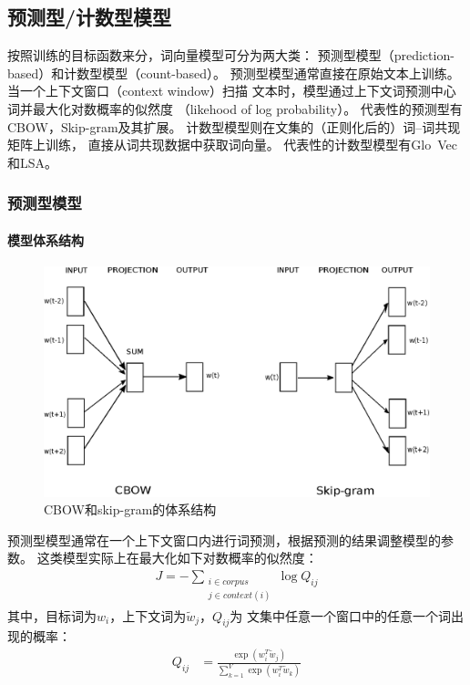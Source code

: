 \subsection{预测型/计数型模型}
按照训练的目标函数来分，词向量模型可分为两大类：
预测型模型（prediction-based）和计数型模型（count-based）。
预测型模型通常直接在原始文本上训练。
当一个上下文窗口（context window）扫描
文本时，模型通过上下文词预测中心词并最大化对数概率的似然度
（likehood of log probability）。
代表性的预测型有CBOW，Skip-gram及其扩展。
计数型模型则在文集的（正则化后的）词--词共现矩阵上训练，
直接从词共现数据中获取词向量。
代表性的计数型模型有Glo~Vec和LSA。

\subsubsection{预测型模型}

\paragraph{模型体系结构}
\begin{figure}
  \centering
  \includegraphics[width=\textwidth]{figures/word2vec-architecture.eps}
  \caption{CBOW和skip-gram的体系结构\cite{DBLP:journals/corr/abs-1301-3781}}
  \label{fig:word2vec-arch}
\end{figure}

预测型模型通常在一个上下文窗口内进行词预测，根据预测的结果调整模型的参数。
这类模型实际上在最大化如下对数概率的似然度：
\begin{align}
  J = - \sum_{\substack{i \in corpus \\ j \in context(i)}} \log Q_{ij}
\end{align}
其中，目标词为$w_i$，上下文词为$\tilde{w}_j$，$Q_{ij}$为
文集中任意一个窗口中的任意一个词出现的概率：
\begin{align}
  Q_{ij} &= \frac{\exp(w_i^T \tilde{w}_j)}
  {\sum_{k=1}^V \exp(w_i^T \tilde{w}_k)}
\end{align}

